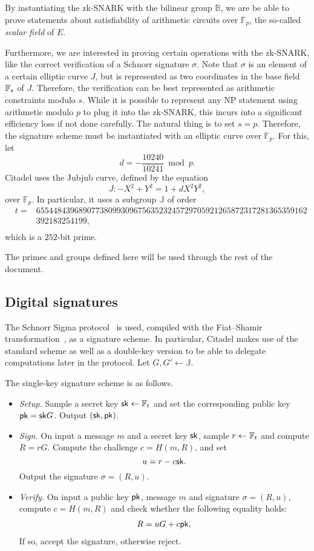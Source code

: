 By instantiating the zk-SNARK with the bilinear group $\mathbb{B}$, we are be able to prove statements about satisfiability of arithmetic circuits over $\mathbb{F}_p$, the so-called \emph{scalar field} of $E$. 

Furthermore, we are interested in proving certain operations with the zk-SNARK, like the correct verification of a Schnorr signature $\sigma$. Note that $\sigma$ is an element of a certain elliptic curve $J$, but is represented as two coordinates in the base field $\mathbb{F}_s$ of $J$. Therefore, the verification can be best represented as arithmetic constraints modulo $s$. While it is possible to represent any NP statement using arithmetic modulo $p$ to plug it into the zk-SNARK, this incurs into a significant efficiency loss if not done carefully. The natural thing is to set $s=p$. Therefore, the signature scheme must be instantiated with an elliptic curve over $\mathbb{F}_p$. For this, let
\[d = -\frac{10240}{10241} \bmod{p}.\]
Citadel uses the Jubjub curve, defined by the equation
\[J : -X^2+Y^2 = 1 + dX^2Y^2,\]
over $\mathbb{F}_p$. In particular, it uses a subgroup $\mathbb{J}$ of order
\[\begin{array}{lll}
	& t = & 6554484396890773809930967563523245729705921265872317281365359162 \\
	& & 392183254199,\\
\end{array}\]
which is a $252$-bit prime. 

The primes and groups defined here will be used through the rest of the document.

\subsection{Digital signatures}\label{sec:signatures}

The Schnorr Sigma protocol~\cite{schnorr1989efficient} is used, compiled with the Fiat--Shamir transformation~\cite{fiat1986prove,pointcheval1996security}, as a signature scheme. 
In particular, Citadel makes use of the standard scheme as well as a double-key version to be able to delegate computations later in the protocol. Let $G, G'\gets \mathbb{J}$.

The single-key signature scheme is as follows.

\begin{itemize}
	\item \emph{Setup.} Sample a secret key $\mathsf{sk} \gets \mathbb{F}_t$ and set the corresponding public key $\mathsf{pk} = \mathsf{sk} G$. Output $(\mathsf{sk}, \mathsf{pk})$. 
	\item \emph{Sign.} On input a message $m$ and a secret key $\mathsf{sk}$, sample $r \gets \mathbb{F}_t$ and compute $R = rG$. Compute the challenge $c = H(m, R)$, and set 
	\[u = r - c \mathsf{sk}.\]
	Output the signature $\sigma = (R, u)$. 
	\item \emph{Verify.} On input a public key $\mathsf{pk}$, message $m$ and signature $\sigma = (R, u)$, compute $c = H(m, R)$ and check whether the following equality holds:
	\[\begin{aligned}
		& R = uG + c \mathsf{pk}, \\
	\end{aligned}\]
	If so, accept the signature, otherwise reject.
\end{itemize}

